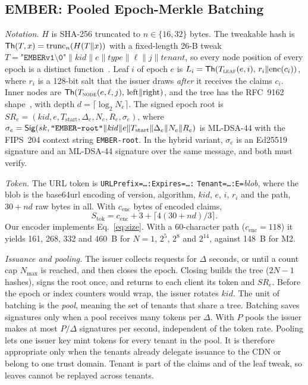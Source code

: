 \subsection{EMBER: Pooled Epoch-Merkle Batching}
\label{sec:ember}
\emph{Notation.} $H$ is SHA-256 truncated to $n\in\{16,32\}$ bytes. The tweakable hash is $\mathsf{Th}(T,x)=\mathrm{trunc}_n(H(T\|x))$ with a fixed-length 26-B tweak $T=\texttt{"EMBERv1\textbackslash0"}\|\mathit{kid}\|e\|\mathit{type}\|\ell\|j\|\mathit{tenant}$, so every node position of every epoch is a distinct function~\cite{sphincsplus2019}. Leaf $i$ of epoch $e$ is $L_i=\mathsf{Th}(T_{\textsc{leaf}}(e,i),\,r_i\|\mathrm{enc}(c_i))$, where $r_i$ is a 128-bit salt that the issuer draws \emph{after} it receives the claims $c_i$. Inner nodes are $\mathsf{Th}(T_{\textsc{node}}(e,\ell,j),\,\text{left}\|\text{right})$, and the tree has the RFC~9162 shape~\cite{rfc9162}, with depth $d=\lceil\log_2N_e\rceil$. The signed epoch root is $SR_e=(\mathit{kid},e,T_{\text{start}},\Delta_e,N_e,R_e,\sigma_e)$, where $\sigma_e=\mathsf{Sig}(sk,\texttt{"EMBER-root"}\|\mathit{kid}\|e\|T_{\text{start}}\|\Delta_e\|N_e\|R_e)$ is ML-DSA-44 with the FIPS~204 context string \texttt{EMBER-root}. In the hybrid variant, $\sigma_e$ is an Ed25519 signature and an ML-DSA-44 signature over the same message, and both must verify.

\emph{Token.} The URL token is \texttt{URLPrefix=\ldots:Expires=\ldots:} \texttt{Tenant=\ldots:E=}\textit{blob}, where the blob is the base64url encoding of version, algorithm, $\mathit{kid}$, $e$, $i$, $r_i$ and the path, $30+nd$ raw bytes in all. With $c_{\text{enc}}$ bytes of encoded claims,
\begin{equation}
S_{\text{tok}}=c_{\text{enc}}+3+\lceil 4(30+nd)/3\rceil .
\label{eq:size}
\end{equation}
Our encoder implements Eq.~\eqref{eq:size}. With a 60-character path ($c_{\text{enc}}=118$) it yields 161, 268, 332 and 460~B for $N=1$, $2^5$, $2^8$ and $2^{14}$, against 148~B for M2.

\emph{Issuance and pooling.} The issuer collects requests for $\Delta$ seconds, or until a count cap $N_{\max}$ is reached, and then closes the epoch. Closing builds the tree ($2N-1$ hashes), signs the root once, and returns to each client its token and $SR_e$. Before the epoch or index counters would wrap, the issuer rotates $\mathit{kid}$. The unit of batching is the \emph{pool}, meaning the set of tenants that share a tree. Batching saves signatures only when a pool receives many tokens per $\Delta$. With $P$ pools the issuer makes at most $P/\Delta$ signatures per second, independent of the token rate. Pooling lets one issuer key mint tokens for every tenant in the pool. It is therefore appropriate only when the tenants already delegate issuance to the CDN or belong to one trust domain. Tenant is part of the claims and of the leaf tweak, so leaves cannot be replayed across tenants.


